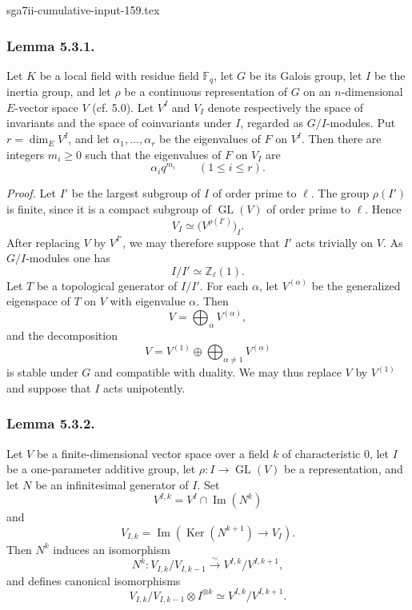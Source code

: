 \begin{filecontents*}{sga7ii-cumulative-input-159.tex}
\subsubsection*{Lemma 5.3.1.}
Let $K$ be a local field with residue field $\mathbb F_q$, let $G$ be its
Galois group, let $I$ be the inertia group, and let $\rho$ be a continuous
representation of $G$ on an $n$-dimensional $E$-vector space $V$ (cf. 5.0).
Let $V^I$ and $V_I$ denote respectively the space of invariants and the
space of coinvariants under $I$, regarded as $G/I$-modules.  Put
$r=\dim_E V^I$, and let $\alpha_1,\ldots,\alpha_r$ be the eigenvalues of
$F$ on $V^I$.  Then there are integers $m_i\geq0$ such that the eigenvalues
of $F$ on $V_I$ are
\[
\alpha_iq^{m_i}\qquad(1\leq i\leq r).
\]

\medskip
\noindent\emph{Proof.}
Let $I'$ be the largest subgroup of $I$ of order prime to $\ell$.  The group
$\rho(I')$ is finite, since it is a compact subgroup of $\operatorname{GL}(V)$
of order prime to $\ell$.  Hence
\[
V_I\simeq\bigl(V^{\rho(I')}\bigr)_I.
\]
After replacing $V$ by $V^{I'}$, we may therefore suppose that $I'$ acts
trivially on $V$.  As $G/I$-modules one has
\[
I/I'\simeq\mathbb Z_\ell(1).
\]
Let $T$ be a topological generator of $I/I'$.  For each $\alpha$, let
$V^{(\alpha)}$ be the generalized eigenspace of $T$ on $V$ with eigenvalue
$\alpha$.  Then
\[
V=\bigoplus_\alpha V^{(\alpha)},
\]
and the decomposition
\[
V=V^{(1)}\oplus\bigoplus_{\alpha\ne1}V^{(\alpha)}
\]
is stable under $G$ and compatible with duality.  We may thus replace $V$
by $V^{(1)}$ and suppose that $I$ acts unipotently.

\subsubsection*{Lemma 5.3.2.}
Let $V$ be a finite-dimensional vector space over a field $k$ of
characteristic $0$, let $I$ be a one-parameter additive group, let
$\rho:I\longrightarrow\operatorname{GL}(V)$ be a representation, and let
$N$ be an infinitesimal generator of $I$.  Set
\[
V^{I,k}=V^I\cap\operatorname{Im}(N^k)
\]
and
\[
V_{I,k}=\operatorname{Im}\!\left(\operatorname{Ker}(N^{k+1})
\longrightarrow V_I\right).
\]
Then $N^k$ induces an isomorphism
\[
N^k:V_{I,k}/V_{I,k-1}\xrightarrow{\sim}
V^{I,k}/V^{I,k+1},
\]
and defines canonical isomorphisms
\[
V_{I,k}/V_{I,k-1}\otimes I^{\otimes k}
\simeq V^{I,k}/V^{I,k+1}.
\]


\end{filecontents*}
